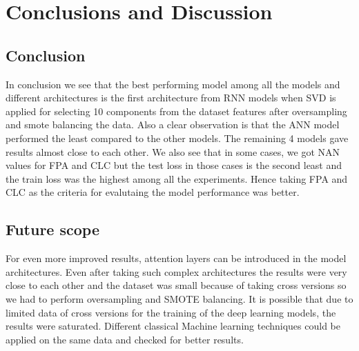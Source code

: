 \chapter{Conclusions and Discussion}\label{final}

\section{Conclusion}

In conclusion we see that the best performing model among all the models and different architectures is the first architecture from RNN models when SVD is applied for selecting 10 components from the dataset features after oversampling and smote balancing the data. Also a clear observation is that the ANN model performed the least compared to the other models. The remaining 4 models gave results almost close to each other. We also see that in some cases, we got NAN values for FPA and CLC but the test loss in those cases is the second least and the train loss was the highest among all the experiments. Hence taking FPA and CLC as the criteria for evalutaing the model performance was better. 

\section{Future scope}
For even more improved results, attention layers can be introduced in the model architectures. Even after taking such complex architectures the results were very close to each other and the dataset was small because of taking cross versions so we had to perform oversampling and SMOTE balancing. It is possible that due to limited data of cross versions for the training of the deep learning models, the results were saturated. Different classical Machine learning techniques could be applied on the same data and checked for better results.

